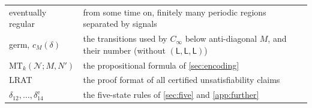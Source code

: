 \begin{center}
\begin{tabular}{@{}p{}p{}@{}}
eventually regular & from some time on, finitely many periodic regions separated by signals\\
germ, $c_M(\delta)$ & the transitions used by $C_\infty$ below anti-diagonal $M$, and their number
  (without $(\mathsf L,\mathsf L,\mathsf L)$)\\
$\mathrm{MT}_k(\mathcal N;M,N')$ & the propositional formula of \cref{sec:encoding}\\
LRAT & the proof format of all certified unsatisfiability claims\\
$\delta_{12},\dots,\delta_{14}^{\mathrm e}$ & the five-state rules of \cref{sec:five} and
  \cref{app:further}\\
\bottomrule
\end{tabular}
\end{center}
